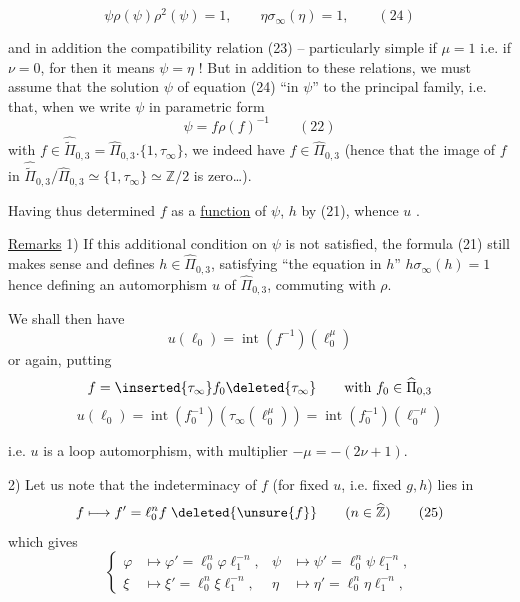 

\[
\boxed{\psi\rho(\psi)\rho^2(\psi)=1,\qquad\eta\sigma_\infty(\eta)=1},
\qquad (24)
\]

and in addition the compatibility relation (23) -- particularly simple if $\mu=1$ i.e. if $\nu=0$, for then it means $\psi=\eta$ ! But in addition to these relations, we must assume that the solution $\psi$ of equation (24) ``in $\psi$''  to the principal family, i.e. that, when we write $\psi$ in parametric form
\[
\psi=f\rho(f)^{-1}
\qquad (22)
\]
with $f\in\widehat{\widetilde{\Pi}}_{0,3}=\widehat{\Pi}_{0,3}.\{1,\tau_\infty\}$, we indeed have $f\in\widehat{\Pi}_{0,3}$ (hence that the image of $f$ in $\widehat{\widetilde{\Pi}}_{0,3}/\widehat{\Pi}_{0,3}\simeq\{1,\tau_\infty\}\simeq\mathbb Z/2$ is zero\dots).

Having thus determined $f$ as a \uline{function} of $\psi$,  $h$ by (21), whence $u$ .

\uline{Remarks} 1) If this additional condition on $\psi$ is not satisfied, the  formula (21) still makes sense and defines $h\in\widehat{\Pi}_{0,3}$, satisfying ``the equation in $h$'' $h\sigma_\infty(h)=1$ hence defining an automorphism $u$ of $\widehat{\Pi}_{0,3}$, commuting with $\rho$.

We shall then have
\[
u(\ell_0)=\operatorname{int}(f^{-1})(\ell_0^\mu)
\]
or again, putting
\[
f=\inserted{\tau_\infty}f_0\deleted{\tau_\infty}\qquad\text{with }f_0\in\widehat{\Pi}_{0,3}
\]
\[
u(\ell_0)=\operatorname{int}(f_0^{-1})(\tau_\infty(\ell_0^\mu))=\operatorname{int}(f_0^{-1})(\ell_0^{-\mu})
\]



i.e. $u$ is a loop automorphism, with multiplier $-\mu=-(2\nu+1)$.

2) Let us note that the indeterminacy of $f$ (for fixed $u$, i.e. fixed $g,h$) lies in
\[
 f\longmapsto f'=\ell_0^n f\;\deleted{\unsure{f}}
 \qquad(n\in\widehat{\mathbb Z})
 \tag{25}
\]
which gives
\[
 \left\{\begin{aligned}
 \varphi&\longmapsto\varphi'=\ell_0^n\varphi\ell_1^{-n},&
 \psi&\longmapsto\psi'=\ell_0^n\psi\ell_1^{-n},\\
 \xi&\longmapsto\xi'=\ell_0^n\xi\ell_1^{-n},&
 \eta&\longmapsto\eta'=\ell_0^n\eta\ell_1^{-n},
 \end{aligned}\right.
 \tag{26}
\]

